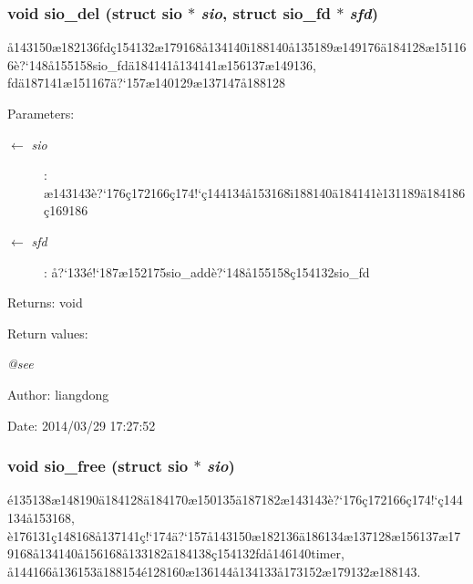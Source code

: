 \subsubsection{\setlength{\rightskip}{0pt plus 5cm}void sio\_\-del (struct sio $\ast$ {\em sio}, struct sio\_\-fd $\ast$ {\em sfd})}\label{sio_8c_a5}


\aa{}143150\ae{}182136fd\c{c}154132\ae{}179168\aa{}134140\"{\i}188140\aa{}135189\ae{}149176\"{a}184128\ae{}151166\`{e}?`148\aa{}155158sio\_\-fd\"{a}184141\aa{}134141\ae{}156137\ae{}149136, fd\"{a}187141\ae{}151167\"{a}?`157\ae{}140129\ae{}137147\aa{}188128 

\begin{Desc}
\item[Parameters:]
\begin{description}
\item[\mbox{$\leftarrow$} {\em sio}]: \ae{}143143\`{e}?`176\c{c}172166\c{c}174!`\c{c}144134\aa{}153168\"{\i}188140\"{a}184141\`{e}131189\"{a}184186\c{c}169186 \item[\mbox{$\leftarrow$} {\em sfd}]: \aa{}?`133\'{e}!`187\ae{}152175sio\_\-add\`{e}?`148\aa{}155158\c{c}154132sio\_\-fd \end{description}
\end{Desc}
\begin{Desc}
\item[Returns:]void \end{Desc}
\begin{Desc}
\item[Return values:]
\begin{description}
\item[{\em @see}]\end{description}
\end{Desc}
\begin{Desc}
\item[Author:]liangdong \end{Desc}
\begin{Desc}
\item[Date:]2014/03/29 17:27:52 \end{Desc}
\subsubsection{\setlength{\rightskip}{0pt plus 5cm}void sio\_\-free (struct sio $\ast$ {\em sio})}\label{sio_8c_a2}


\'{e}135138\ae{}148190\"{a}184128\"{a}184170\ae{}150135\"{a}187182\ae{}143143\`{e}?`176\c{c}172166\c{c}174!`\c{c}144134\aa{}153168, \`{e}176131\c{c}148168\aa{}137141\c{c}!`174\"{a}?`157\aa{}143150\ae{}182136\"{a}186134\ae{}137128\ae{}156137\ae{}179168\aa{}134140\aa{}156168\aa{}133182\"{a}184138\c{c}154132fd\aa{}146140timer, \aa{}144166\aa{}136153\"{a}188154\'{e}128160\ae{}136144\aa{}134133\aa{}173152\ae{}179132\ae{}188143. 

